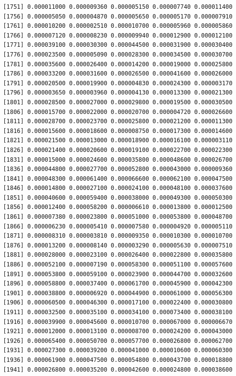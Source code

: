 \documentclass[]{article}
\begin{document}
\begin{verbatim}
 [1751] 0.000011000 0.000009360 0.000005150 0.000007740 0.000011400
 [1756] 0.000005050 0.000004870 0.000005650 0.000005170 0.000007910
 [1761] 0.000010200 0.000002510 0.000010700 0.000005960 0.000005860
 [1766] 0.000007120 0.000008230 0.000009940 0.000012900 0.000012100
 [1771] 0.000039100 0.000030300 0.000044500 0.000031900 0.000030400
 [1776] 0.000023500 0.000005090 0.000028300 0.000034500 0.000030700
 [1781] 0.000035600 0.000026400 0.000014200 0.000019000 0.000025800
 [1786] 0.000033200 0.000031600 0.000026500 0.000041600 0.000026000
 [1791] 0.000020500 0.000019900 0.000004830 0.000024300 0.000003170
 [1796] 0.000003650 0.000003960 0.000004130 0.000013300 0.000021300
 [1801] 0.000028500 0.000027000 0.000029800 0.000019500 0.000030500
 [1806] 0.000015700 0.000022000 0.000020700 0.000004720 0.000026600
 [1811] 0.000028700 0.000023700 0.000025800 0.000021200 0.000011300
 [1816] 0.000015600 0.000018600 0.000008750 0.000017300 0.000014600
 [1821] 0.000021500 0.000013000 0.000018900 0.000016100 0.000003110
 [1826] 0.000021400 0.000020600 0.000019100 0.000022700 0.000022300
 [1831] 0.000015000 0.000024600 0.000035800 0.000048600 0.000026700
 [1836] 0.000044800 0.000027700 0.000052800 0.000043000 0.000009360
 [1841] 0.000048300 0.000061400 0.000066600 0.000062100 0.000047500
 [1846] 0.000014800 0.000027100 0.000024100 0.000048100 0.000037600
 [1851] 0.000040600 0.000059400 0.000038000 0.000049300 0.000050300
 [1856] 0.000012400 0.000058200 0.000006610 0.000013800 0.000012500
 [1861] 0.000007380 0.000023800 0.000051000 0.000053800 0.000048700
 [1866] 0.000006230 0.000005410 0.000007580 0.000004920 0.000005110
 [1871] 0.000008310 0.000003810 0.000009350 0.000010300 0.000010700
 [1876] 0.000013200 0.000008140 0.000003290 0.000005630 0.000007510
 [1881] 0.000028000 0.000023100 0.000026400 0.000022800 0.000035800
 [1886] 0.000052100 0.000007190 0.000058300 0.000051100 0.000057600
 [1891] 0.000053800 0.000059100 0.000023900 0.000044700 0.000032600
 [1896] 0.000058800 0.000037400 0.000061700 0.000045900 0.000042300
 [1901] 0.000038800 0.000006920 0.000044900 0.000061000 0.000056300
 [1906] 0.000060500 0.000046300 0.000017100 0.000022400 0.000030800
 [1911] 0.000032500 0.000035100 0.000034100 0.000073400 0.000038100
 [1916] 0.000039900 0.000045600 0.000010700 0.000067000 0.000006670
 [1921] 0.000012000 0.000013100 0.000008700 0.000024200 0.000043000
 [1926] 0.000065400 0.000050700 0.000057700 0.000026800 0.000062700
 [1931] 0.000027300 0.000039200 0.000041000 0.000010600 0.000060300
 [1936] 0.000061900 0.000047500 0.000054800 0.000043700 0.000018800
 [1941] 0.000026800 0.000035200 0.000042600 0.000024800 0.000038600

\end{verbatim}
\end{document}
